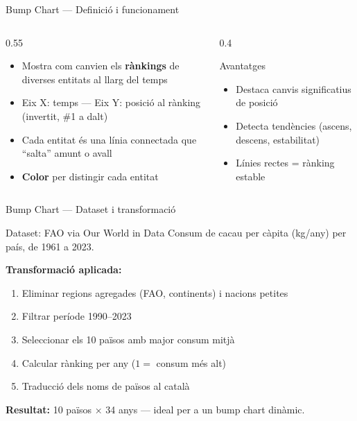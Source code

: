 \documentclass[aspectratio=169, 11pt]{beamer}
\begin{document}

\begin{frame}{Bump Chart --- Definició i funcionament}
\begin{columns}
\begin{column}{0.55\textwidth}
\begin{itemize}
    \item Mostra com canvien els \textbf{rànkings} de diverses entitats al llarg del temps
    \item Eix X: temps --- Eix Y: posició al rànking (invertit, \#1 a dalt)
    \item Cada entitat és una línia connectada que ``salta'' amunt o avall
    \item \textbf{Color} per distingir cada entitat
\end{itemize}
\end{column}
\begin{column}{0.4\textwidth}
\begin{block}{Avantatges}
    \small
    \begin{itemize}
        \item Destaca canvis significatius de posició
        \item Detecta tendències (ascens, descens, estabilitat)
        \item Línies rectes = rànking estable
    \end{itemize}
\end{block}
\end{column}
\end{columns}
\end{frame}

\begin{frame}{Bump Chart --- Dataset i transformació}
\begin{block}{Dataset: FAO via Our World in Data}
    Consum de cacau per càpita (kg/any) per país, de 1961 a 2023.
\end{block}

\vspace{0.8em}

\textbf{Transformació aplicada:}
\begin{enumerate}
    \item Eliminar regions agregades (FAO, continents) i nacions petites
    \item Filtrar període 1990--2023
    \item Seleccionar els 10 països amb major consum mitjà
    \item Calcular rànking per any ($1 =$ consum més alt)
    \item Traducció dels noms de països al català
\end{enumerate}

\vspace{0.5em}
\small
\textbf{Resultat:} 10 països × 34 anys --- ideal per a un bump chart dinàmic.
\end{frame}
\end{document}
